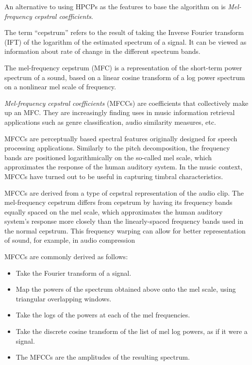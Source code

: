An alternative to using HPCPs as the features to base the algorithm on is \textit{Mel-frequency cepstral coefficients}.

The term ``cepstrum'' refers to the result of taking the Inverse Fourier transform (IFT) of the logarithm of the estimated spectrum of a signal. It can be viewed as information about rate of change in the different spectrum bands.

The mel-frequency cepstrum (MFC) is a representation of the short-term power spectrum of a sound, based on a linear cosine transform of a log power spectrum on a nonlinear mel scale of frequency. 

\textit{Mel-frequency cepstral coefficients} (MFCCs) are coefficients that collectively make up an MFC. They are increasingly finding uses in music information retrieval applications such as genre classification, audio similarity measures, etc.

MFCCs are perceptually based spectral features originally designed for speech processing applications. Similarly to the pitch decomposition, the frequency bands are positioned logarithmically on the so-called mel scale, which approximates the response of the human auditory system. In the music context, MFCCs have turned out to be useful in capturing timbral characteristics.

MFCCs are derived from a type of cepstral representation of the audio clip. The mel-frequency cepstrum differs from cepstrum by having its frequency bands equally spaced on the mel scale, which approximates the human auditory system's response more closely than the linearly-spaced frequency bands used in the normal cepstrum. This frequency warping can allow for better representation of sound, for example, in audio compression \cite{mfcc}

MFCCs are commonly derived as follows:
\begin{itemize}
\item Take the Fourier transform of a signal.
\item Map the powers of the spectrum obtained above onto the mel scale, using triangular overlapping windows.
\item Take the logs of the powers at each of the mel frequencies.
\item Take the discrete cosine transform of the list of mel log powers, as if it were a signal.
\item The MFCCs are the amplitudes of the resulting spectrum.
\end{itemize}

